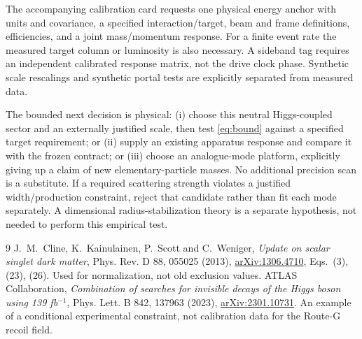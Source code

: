 \documentclass[11pt,a4paper]{article}
\begin{document}
The accompanying calibration card requests one physical energy anchor
with units and covariance, a specified interaction/target, beam and
frame definitions, efficiencies, and a joint mass/momentum response.
For a finite event rate the measured target column or luminosity is
also necessary. A sideband tag requires an independent calibrated
response matrix, not the drive clock phase. Synthetic scale rescalings
and synthetic portal tests are explicitly separated from measured data.

The bounded next decision is physical: (i) choose this neutral
Higgs-coupled sector and an externally justified scale, then test
\eqref{eq:bound} against a specified target requirement; or (ii) supply
an existing apparatus response and compare it with the frozen contract;
or (iii) choose an analogue-mode platform, explicitly giving up a claim
of new elementary-particle masses. No additional precision scan is a
substitute. If a required scattering strength violates a justified
width/production constraint, reject that candidate rather than fit
each mode separately. A dimensional radius-stabilization theory is a
separate hypothesis, not needed to perform this empirical test.

\begin{thebibliography}{9}
 J.~M.~Cline, K.~Kainulainen, P.~Scott and C.~Weniger,
\emph{Update on scalar singlet dark matter}, Phys. Rev. D 88, 055025 (2013),
\href{https://arxiv.org/abs/1306.4710}{arXiv:1306.4710},
Eqs.~(3), (23), (26). Used for normalization, not old exclusion values.
 ATLAS Collaboration, \emph{Combination of searches for
invisible decays of the Higgs boson using 139 fb$^{-1}$},
Phys. Lett. B 842, 137963 (2023),
\href{https://arxiv.org/abs/2301.10731}{arXiv:2301.10731}.
An example of a conditional experimental constraint, not calibration
data for the Route-G recoil field.
\end{thebibliography}
\end{document}
